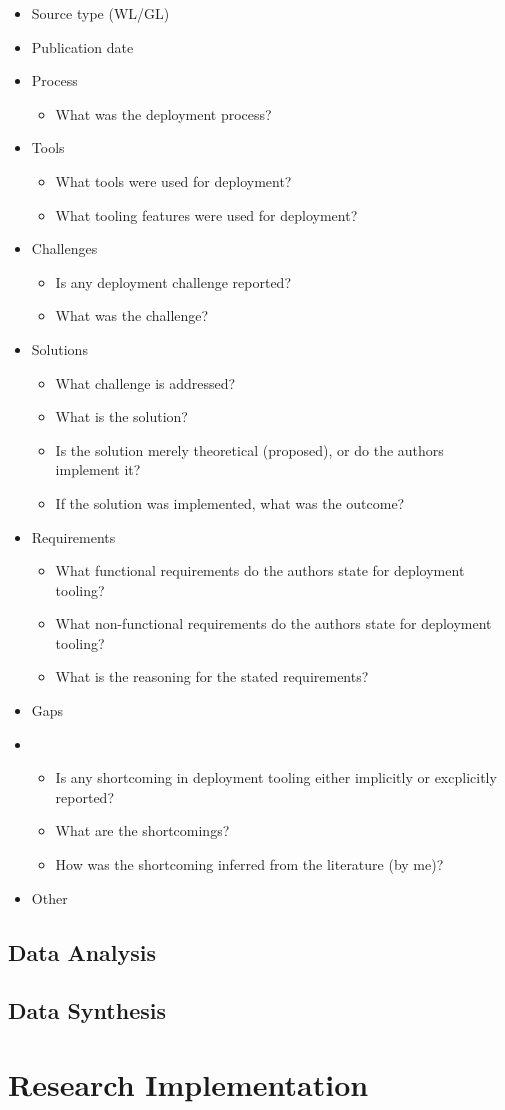\begin{itemize}
    \item Source type (WL/GL)
    \item Publication date
    \item Process
    \begin{itemize}
        \item What was the deployment process?
    \end{itemize}
    \item Tools
    \begin{itemize}
        \item What tools were used for deployment?
        \item What tooling features were used for deployment?
    \end{itemize}
    \item Challenges
    \begin{itemize}
        \item Is any deployment challenge reported?
        \item What was the challenge?
    \end{itemize}
    \item Solutions
    \begin{itemize}
        \item What challenge is addressed?
        \item What is the solution?
        \item Is the solution merely theoretical (proposed), or do the authors implement it?
        \item If the solution was implemented, what was the outcome?
    \end{itemize}
    \item Requirements
    \begin{itemize}
        \item What functional requirements do the authors state for deployment tooling?
        \item What non-functional requirements do the authors state for deployment tooling?
        \item What is the reasoning for the stated requirements?
    \end{itemize}
    \item Gaps
    \item \begin{itemize}
        \item Is any shortcoming in deployment tooling either implicitly or excplicitly reported?
        \item What are the shortcomings?
        \item How was the shortcoming inferred from the literature (by me)?
    \end{itemize}
    \item Other
\end{itemize}

\subsection{Data Analysis}
\subsection{Data Synthesis}

\section{Research Implementation}
\label{sec:research_implementation}